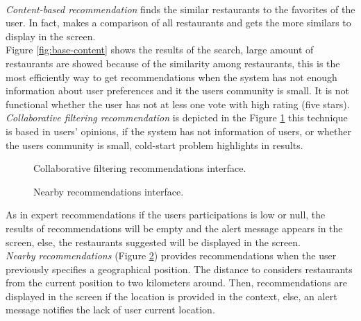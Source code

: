 \\ \textit{Content-based recommendation} finds the similar restaurants to the
favorites of the user. In fact, makes a comparison of all restaurants
and gets the more similars to display in the screen. \\
Figure  \ref{fig:base-content}  
shows the results of the search, large amount of restaurants are showed
because of the similarity among restaurants, this is the most
efficiently way to get recommendations when the system has not enough
information about user preferences and it the users community is
small. It is not functional whether the user has not at less one vote
with high rating (five stars).\\
\textit{Collaborative filtering recommendation} is depicted in the 
Figure  \ref{fig:cf-recs}
this technique is based in users' opinions, if the system has not
information of users, or whether the users community is small, 
cold-start problem highlights in results. 
\begin{figure}
\captionsetup{font=footnotesize}
\centering
{}
\caption{Collaborative filtering recommendations interface.}
\label{fig:cf-recs}   
\end{figure}
\begin{figure}
\captionsetup{font=footnotesize}
\centering
{}
\caption{Nearby recommendations interface.}
\label{fig:nearby-recs}   
\end{figure}
As in expert  recommendations if the users participations 
is low or null, the results of recommendations will be empty 
and the alert message appears in the
screen, else, the restaurants suggested will be displayed 
in the screen.\\
\textit{Nearby recommendations} (Figure  \ref{fig:nearby-recs}) 
provides recommendations when the
user previously specifies a geographical position. The distance to
considers restaurants from the current position to two kilometers
around. Then, recommendations are displayed in the screen if the
location is provided in the context, else, an alert message  notifies
the lack of user current location.


